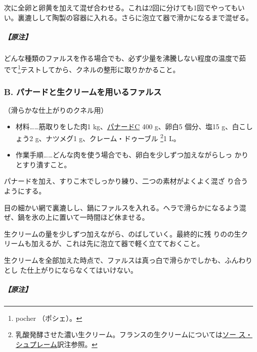 \begin{recette}
次に全卵と卵黄を加えて混ぜ合わせる。これは2回に分けても1回でやってもい
い。裏漉しして陶製の容器に入れる。さらに泡立て器で滑かになるまで混ぜる。

\hypertarget{nota-farce-a}{%
\subparagraph{【原注】}\label{nota-farce-a}}

どんな種類のファルスを作る場合でも、必ず少量を沸騰しない程度の温度で茹
でて\footnote{pocher （ポシェ）。}テストしてから、クネルの整形に取りかかること。

\hypertarget{farce-b}{%
\subsubsection{B. パナードと生クリームを用いるファルス}\label{farce-b}}



（滑らかな仕上がりのクネル用）

\begin{itemize}
\item
  材料\ldots{}\ldots{}筋取りをした肉1
  kg、\protect\hyperlink{panade-c}{パナードC} 400 g、卵白5 個分、塩15
  g、白こしょう2 g、ナツメグ1 g、クレーム・ドゥーブル \footnote{乳酸発酵させた濃い生クリーム。フランスの生クリームについては\protect\hyperlink{sauce-supreme}{ソー
    ス・シュプレーム}訳注参照。}1\undemi{} L。
\item
  作業手順\ldots{}\ldots{}どんな肉を使う場合でも、卵白を少しずつ加えながらしっ
  かりとすり潰すこと。
\end{itemize}

パナードを加え、すりこ木でしっかり練り、二つの素材がよくよく混ざ
り合うようにする。

目の細かい網で裏漉しし、鍋にファルスを入れる。ヘラで滑らかになるよう混
ぜ、鍋を氷の上に置いて一時間ほど休ませる。

生クリームの\untiers{}量を少しずつ加えながら、のばしていく。最終的に残
りの\deuxtiers{}の生クリームも加えるが、これは先に泡立て器で軽く立てておくこと。

生クリームを全部加えた時点で、ファルスは真っ白で滑らかでしかも、ふんわりとし
た仕上がりにならなくてはいけない。

\hypertarget{nota-farce-b}{%
\subparagraph{【原注】}\label{nota-farce-b}}


\end{recette}
